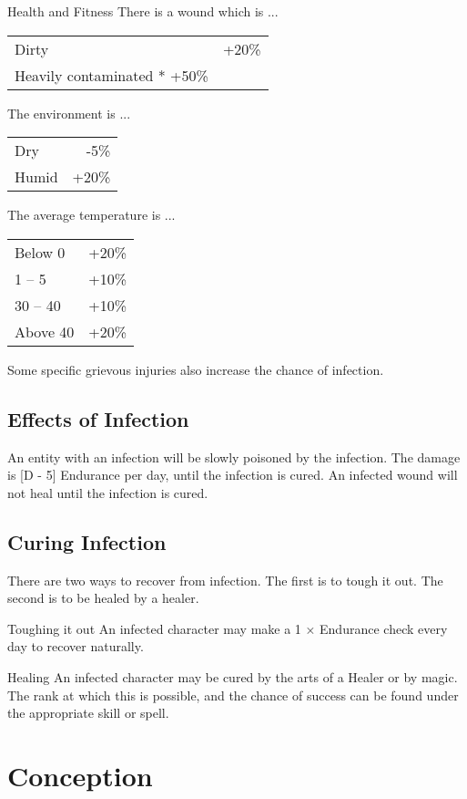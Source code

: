 \begin{Chapter}{Health and Fitness}
There is a wound which is ... 
\begin{tabularx}{\columnwidth}{Xr}
Dirty 			& +20\% \\ 
Heavily contaminated	* +50\% \\
\end{tabularx}

The environment is ... 
\begin{tabularx}{\columnwidth}{Xr}
Dry		& -5\% \\  
Humid		& +20\% \\
\end{tabularx}

The average temperature is ... 
\begin{tabularx}{\columnwidth}{Xr}
Below 0		& +20\% \\
1 – 5		& +10\% \\
30 – 40		& +10\% \\
Above 40	& +20\% \\
\end{tabularx}

Some  specific  grievous  injuries  also  increase  the 
chance of infection.

\subsection{Effects of Infection}

An entity with an infection will be slowly poisoned by the
infection. The damage is [D - 5] Endurance per day, until the
infection is cured.  An infected wound will not heal until the
infection is cured.

\subsection{Curing Infection}

There are two ways to recover from infection. The first is to tough it
out.  The second is to be healed by a healer.

Toughing it out An infected character may make a 1 × Endurance check
every day to recover naturally.

Healing An infected character may be cured by the arts of a Healer or
by magic. The rank at which this is possible, and the chance of
success can be found under the appropriate skill or spell.

\section{Conception}


\end{Chapter}
